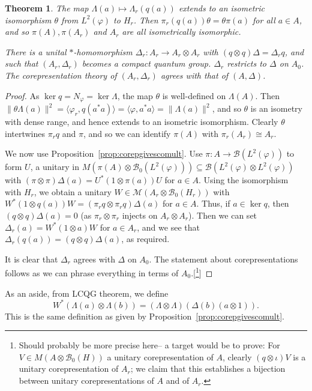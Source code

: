 \documentclass[twoside,a4paper,12pt]{article}
\theoremstyle{plain}
\newtheorem{theorem}[proposition]{Theorem}
\theoremstyle{definition}
\newcommand{\ip}[2]{\langle #1,#2 \rangle}
\newcommand{\mc}{\mathcal}
\begin{document}
\begin{theorem}
The map $\Lambda(a) \mapsto \Lambda_r(q(a))$ extends to an isometric
isomorphism $\theta$ from $L^2(\varphi)$ to $H_r$.  Then $\pi_r(q(a))\theta
= \theta \pi(a)$ for all $a\in A$, and so $\pi(A), \pi(A_r)$ and $A_r$
are all isometrically isomorphic.

There is a unital $*$-homomorphism $\Delta_r:A_r\rightarrow A_r
\otimes A_r$ with $(q\otimes q)\Delta = \Delta_r q$, and such that
$(A_r,\Delta_r)$ becomes a compact quantum group.  $\Delta_r$ restricts
to $\Delta$ on $A_0$.  The corepresentation theory of $(A_r,\Delta_r)$
agrees with that of $(A,\Delta)$.
\end{theorem}
\begin{proof}
As $\ker q = N_\varphi = \ker\Lambda$, the map $\theta$ is well-defined
on $\Lambda(A)$.  Then $\|\theta\Lambda(a)\|^2 = \ip{\varphi_r}{q(a^*a)}
= \ip{\varphi}{a^*a} = \|\Lambda(a)\|^2$, and so $\theta$ is an isometry
with dense range, and hence extends to an isometric isomorphism.
Clearly $\theta$ intertwines $\pi_rq$ and $\pi$, and so we can identify
$\pi(A)$ with $\pi_r(A_r) \cong A_r$.

We now use Proposition~\ref{prop:corepgivescomult}.  Use
$\pi:A\rightarrow\mc B(L^2(\varphi))$ to form $U$, a unitary in
$M(\pi(A)\otimes\mc B_0(L^2(\varphi))) \subseteq
\mc B(L^2(\varphi)\otimes L^2(\varphi))$ with
$(\pi\otimes\pi)\Delta(a) = U^*(1\otimes\pi(a))U$
for $a\in A$.  Using the isomorphism with $H_r$, we obtain a unitary
$W\in\mc M(A_r\otimes\mc B_0(H_r))$ with $W^*(1\otimes q(a))W =
(\pi_rq\otimes\pi_rq)\Delta(a)$ for $a\in A$.  Thus, if $a\in\ker q$, then
$(q\otimes q)\Delta(a)=0$ (as $\pi_r\otimes\pi_r$ injects on $A_r\otimes A_r$).
Then we can set $\Delta_r(a) = W^*(1\otimes a)W$ for $a\in A_r$, and we
see that $\Delta_r(q(a)) = (q\otimes q)\Delta(a)$, as required.

It is clear that $\Delta_r$ agrees with $\Delta$ on $A_0$.  The statement
about corepresentations follows as we can phrase everything in terms of
$A_0$.[\footnote{Should probably be more precise here-- a target would be
to prove: For $V\in M(A\otimes\mc B_0(H))$ a unitary corepresentation of $A$,
clearly $(q\otimes\iota)V$ is a unitary corepresentation of $A_r$; we claim that
this establishes a bijection between unitary corepresentations of $A$ and
of $A_r$.}]
\end{proof}

As an aside, from LCQG theorem, we define
\[ W^*(\Lambda(a)\otimes\Lambda(b))
= (\Lambda\otimes\Lambda)(\Delta(b)(a\otimes 1)). \]
This is the same definition as given by Proposition~\ref{prop:corepgivescomult}.
\end{document}
